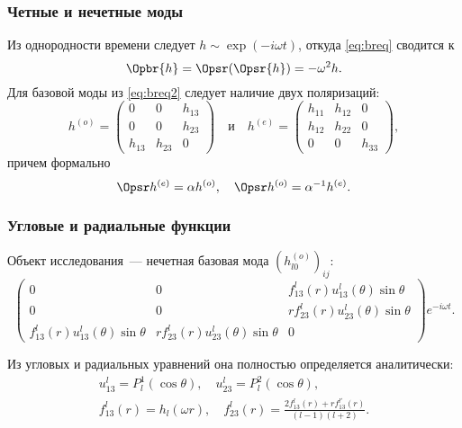 \documentclass[compress]{beamer}
\begin{document}
    \begin{frame}\frametitle{Четные и нечетные моды}

        Из однородности времени следует $h \sim \exp(-i \omega t)$, откуда \autoref{eq:breq} сводится к
        \begin{equation}\label{eq:breq2}
            \Opbr{h} = \Opsr(\Opsr{h}) = - \omega^2 h .
        \end{equation}
        Для базовой моды из \autoref{eq:breq2} следует наличие двух поляризаций:
        \begin{equation*}
            h^{(o)} = \begin{pmatrix}0&0&h_{13}\\0&0&h_{23}\\h_{13}&h_{23}&0\end{pmatrix} \quad\text{и}\quad
            h^{(e)} = \begin{pmatrix}h_{11}&h_{12}&0\\h_{12}&h_{22}&0\\0&0&h_{33}\end{pmatrix} ,
        \end{equation*}
        причем формально
        \begin{equation*}
            \Opsr h^{(e)} = \alpha h^{(o)}, \quad \Opsr h^{(o)} = \alpha^{-1} h^{(e)}.
        \end{equation*}

    \end{frame}


    \begin{frame}\frametitle{Угловые и радиальные функции}

        Объект исследования~--- нечетная базовая мода $(h_{l0}^{(o)})_{ij}$:
        \begin{equation*}
            \begin{pmatrix}
                0&0&f^l_{13}(r)u^l_{13}(\theta)\sin\theta\\
                0&0&r f^l_{23}(r)u^l_{23}(\theta)\sin\theta\\
                f^l_{13}(r)u^l_{13}(\theta)\sin\theta &
                    r f^l_{23}(r)u^l_{23}(\theta)\sin\theta & 0
            \end{pmatrix} e^{-i \omega t}.
        \end{equation*}

        Из угловых и радиальных уравнений она полностью определяется аналитически:
        \begin{gather*}
            u^l_{13} = P_l^1(\cos\theta), \quad u^l_{23} = P_l^2(\cos\theta), \\
            f^l_{13}(r) = h_l(\omega r), \quad
            f^l_{23}(r) = \frac{2 f^l_{13}(r) + r f^{l{'}}_{13}(r)}{(l-1)(l+2)}.
        \end{gather*}

    \end{frame}
\end{document}
